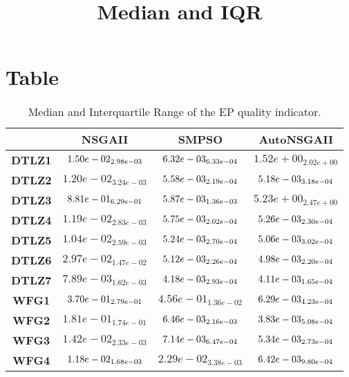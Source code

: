 \documentclass{article}
\title{Median and IQR}
\author{}
\begin{document}
\maketitle
\section{Table}
\begin{table}[!htp]
  \caption{Median and Interquartile Range of the EP quality indicator.}
  \label{table:EP}
  \centering
  \begin{scriptsize}
  \begin{tabular}{c|ccc}
      & \textbf{NSGAII} & \textbf{SMPSO} & \textbf{AutoNSGAII} \\\hline
      \textbf{DTLZ1} & $\cellcolor{gray25} 1.50e-02_{2.98e-03} $ & $ \cellcolor{gray95} 6.32e-03_{6.33e-04} $ & $ 1.52e+00_{2.02e+00}$ \\
      \textbf{DTLZ2} & $1.20e-02_{3.24e-03} $ & $ \cellcolor{gray25} 5.58e-03_{2.19e-04} $ & $ \cellcolor{gray95} 5.18e-03_{3.18e-04}$ \\
      \textbf{DTLZ3} & $\cellcolor{gray25} 8.81e-01_{6.29e-01} $ & $ \cellcolor{gray95} 5.87e-03_{1.36e-03} $ & $ 5.23e+00_{2.47e+00}$ \\
      \textbf{DTLZ4} & $1.19e-02_{2.83e-03} $ & $ \cellcolor{gray25} 5.75e-03_{2.02e-04} $ & $ \cellcolor{gray95} 5.26e-03_{2.30e-04}$ \\
      \textbf{DTLZ5} & $1.04e-02_{2.59e-03} $ & $ \cellcolor{gray25} 5.24e-03_{2.70e-04} $ & $ \cellcolor{gray95} 5.06e-03_{3.02e-04}$ \\
      \textbf{DTLZ6} & $2.97e-02_{1.47e-02} $ & $ \cellcolor{gray25} 5.12e-03_{2.26e-04} $ & $ \cellcolor{gray95} 4.98e-03_{2.20e-04}$ \\
      \textbf{DTLZ7} & $7.89e-03_{1.62e-03} $ & $ \cellcolor{gray25} 4.18e-03_{2.93e-04} $ & $ \cellcolor{gray95} 4.11e-03_{1.65e-04}$ \\
      \textbf{WFG1} & $\cellcolor{gray25} 3.70e-01_{2.79e-01} $ & $ 4.56e-01_{1.36e-02} $ & $ \cellcolor{gray95} 6.29e-03_{4.23e-04}$ \\
      \textbf{WFG2} & $1.81e-01_{1.74e-01} $ & $ \cellcolor{gray25} 6.46e-03_{2.16e-03} $ & $ \cellcolor{gray95} 3.83e-03_{5.08e-04}$ \\
      \textbf{WFG3} & $1.42e-02_{2.33e-03} $ & $ \cellcolor{gray25} 7.14e-03_{6.47e-04} $ & $ \cellcolor{gray95} 5.34e-03_{2.73e-04}$ \\
      \textbf{WFG4} & $\cellcolor{gray25} 1.18e-02_{1.68e-03} $ & $ 2.29e-02_{3.38e-03} $ & $ \cellcolor{gray95} 6.42e-03_{9.80e-04}$ \\

\end{tabular}
\end{scriptsize}
\end{table}
\end{document}
